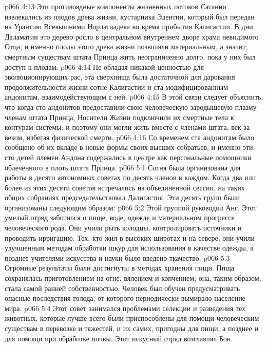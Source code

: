 \vs p066 4:13 Эти противоядные компоненты жизненных потоков Сатании извлекались из плодов древа жизни, кустарника Эдентии, который был передан на Урантию Всевышними Норлатиадека во время прибытия Калигастии. В дни Даламатии это дерево росло в центральном внутреннем дворе храма невидимого Отца, и именно плоды этого древа жизни позволяли материальным, а значит, смертным существам штата Принца жить неограниченно долго, пока у них был доступ к плодам.
\vs p066 4:14 Не обладая никакой ценностью для эволюционирующих рас, эта сверхпища была достаточной для дарования продолжительности жизни сотне Калигастии и ста модифицированным андонитам, взаимодействующим с ней.
\vs p066 4:15 \pc В этой связи следует объяснить, что когда сто андонитов предоставили свою человеческую зародышевую плазму членам штата Принца, Носители Жизни подключили их смертные тела к контурам системы; и поэтому они могли жить вместе с членами штата, век за веком, избегая физической смерти.
\vs p066 4:16 Со временем ста андонитам было сообщено об их вкладе в новые формы своих высших собратьев, и именно эти сто детей племен Андона содержались в центре как персональные помощники облеченного в плоть штата Принца.
\vs p066 5:1 Сотня была организована для работы в десяти автономных советах по десять членов в каждом. Когда два или более из этих десяти советов встречались на объединенной сессии, на таких общих собраниях председательствовал Далигастия. Эти десять групп были организованы следующим образом:
\vs p066 5:2 \pc {}\bibnobreakspace {} Этой группой руководил Анг. Этот умелый отряд заботился о пище, воде, одежде и материальном прогрессе человеческого рода. Они учили рыть колодцы, контролировать источники и проводить ирригацию. Тех, кто жил в высоких широтах и на севере, они учили улучшенным методам обработки шкур для использования в качестве одежды, а позднее учителями искусства и науки было введено ткачество.
\vs p066 5:3 Огромные результаты были достигнуты в методах хранения пищи. Пища сохранялась приготовлением на огне, вялением и копчением; она, таким образом, стала самой ранней собственностью. Человек был обучен предусматривать опасные последствия голода, от которого периодически вымирало население мира.
\vs p066 5:4 \pc {}\bibnobreakspace {} Этот совет занимался проблемами селекции и разведения тех животных, которые лучше всего были приспособлены для помощи человеческим существам в перевозке и тяжестей, и их самих, пригодны для пищи, а позднее и для помощи при обработке почвы. Этот искусный отряд возглавлял Бон.
